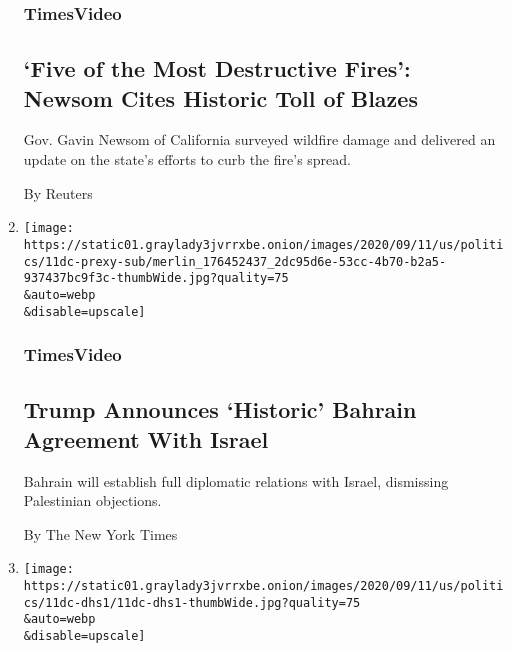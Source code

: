 \begin{enumerate}
  \hypertarget{timesvideo-1}{%
  \subsubsection{TimesVideo}\label{timesvideo-1}}

  \hypertarget{five-of-the-most-destructive-fires-newsom-cites-historic-toll-of-blazes}{%
  \subsection{`Five of the Most Destructive Fires': Newsom Cites
  Historic Toll of
  Blazes}\label{five-of-the-most-destructive-fires-newsom-cites-historic-toll-of-blazes}}

  Gov. Gavin Newsom of California surveyed wildfire damage and delivered
  an update on the state's efforts to curb the fire's spread.

  By Reuters
\item
  \href{/video/us/politics/100000007336256/trump-bahrain-israel.html}{}

  \texttt{[image: https://static01.graylady3jvrrxbe.onion/images/2020/09/11/us/politics/11dc-prexy-sub/merlin\_176452437\_2dc95d6e-53cc-4b70-b2a5-937437bc9f3c-thumbWide.jpg?quality=75\\\&auto=webp\\\&disable=upscale]}

  \hypertarget{timesvideo-2}{%
  \subsubsection{TimesVideo}\label{timesvideo-2}}

  \hypertarget{trump-announces-historic-bahrain-agreement-with-israel}{%
  \subsection{Trump Announces `Historic' Bahrain Agreement With
  Israel}\label{trump-announces-historic-bahrain-agreement-with-israel}}

  Bahrain will establish full diplomatic relations with Israel,
  dismissing Palestinian objections.

  By The New York Times
\item
  \href{/2020/09/11/us/politics/whistle-blower-homeland-security.html}{}

  \texttt{[image: https://static01.graylady3jvrrxbe.onion/images/2020/09/11/us/politics/11dc-dhs1/11dc-dhs1-thumbWide.jpg?quality=75\\\&auto=webp\\\&disable=upscale]}

  \hypertarget{whistle-blowers-complaint-ignites-a-smoldering-homeland-security-agency-1}{%
}
\end{enumerate}
